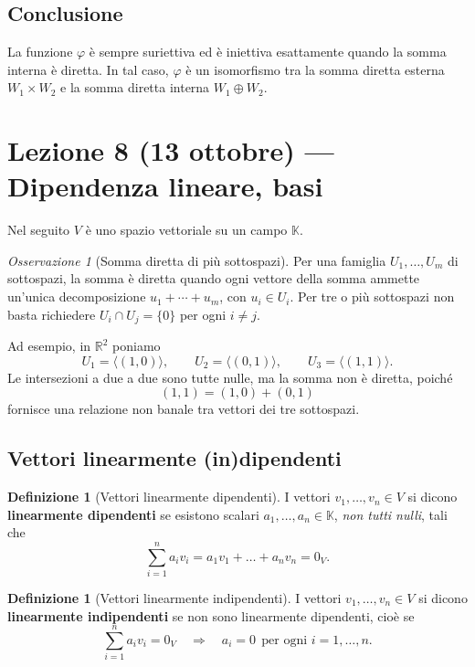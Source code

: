 \documentclass[11pt,a4paper]{article}
\newcommand{\RR}{\mathbb{R}}
\newcommand{\KK}{\mathbb{K}}
\theoremstyle{plain}
\theoremstyle{definition}
\newtheorem{defn}[prop]{Definizione}
\theoremstyle{remark}
\newtheorem{oss}[prop]{Osservazione}
\begin{document}
\subsection{Conclusione}

La funzione $\varphi$ è sempre suriettiva ed è iniettiva esattamente quando la somma interna è diretta. In tal caso, $\varphi$ è un isomorfismo tra la somma diretta esterna $W_1\times W_2$ e la somma diretta interna $W_1\oplus W_2$.

\section{Lezione 8 (13 ottobre) --- Dipendenza lineare, basi}

Nel seguito $V$ è uno spazio vettoriale su un campo $\KK$.

\begin{oss}[Somma diretta di più sottospazi]
Per una famiglia $U_1,\ldots,U_m$ di sottospazi, la somma è diretta quando ogni vettore della somma ammette un'unica decomposizione $u_1+\cdots+u_m$, con $u_i\in U_i$. Per tre o più sottospazi non basta richiedere $U_i\cap U_j=\{0\}$ per ogni $i\neq j$.

Ad esempio, in $\RR^2$ poniamo
\[
 U_1=\langle(1,0)\rangle,\qquad
 U_2=\langle(0,1)\rangle,\qquad
 U_3=\langle(1,1)\rangle.
\]
Le intersezioni a due a due sono tutte nulle, ma la somma non è diretta, poiché
\[
 (1,1)=(1,0)+(0,1)
\]
fornisce una relazione non banale tra vettori dei tre sottospazi.
\end{oss}

\subsection{Vettori linearmente (in)dipendenti}

\begin{defn}[Vettori linearmente dipendenti]
I vettori $v_1,\dots,v_n\in V$ si dicono \textbf{linearmente dipendenti} se esistono scalari $a_1,\dots,a_n\in\KK$, \emph{non tutti nulli}, tali che
\[
  \sum_{i=1}^{n}a_iv_i=a_1v_1+\dots+a_nv_n=0_V .
\]
\end{defn}

\begin{defn}[Vettori linearmente indipendenti]
I vettori $v_1,\dots,v_n\in V$ si dicono \textbf{linearmente indipendenti} se non sono linearmente dipendenti, cioè se
\[
  \sum_{i=1}^{n}a_iv_i=0_V\quad\Longrightarrow\quad a_i=0\ \ \text{per ogni } i=1,\dots,n .
\]
\end{defn}
\end{document}
